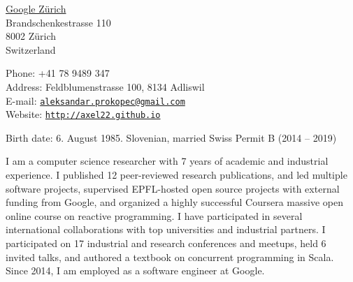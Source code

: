 \documentclass[9pt]{article}
\makeatletter
\def\myaddress{Feldblumenstrasse 100, 8134 Adliswil}
\def\myemail{aleksandar.prokopec@gmail.com}
\def\myweb{http://axel22.github.io}
\def\myphone{+41 78 9489 347}
\makeatother
\begin{document}
\begin{minipage}[t]{1.55in}
 \flushright \href{http://www.google.com/about/company/}{Google Zürich}
   \\ \vspace{-0.03in} Brandschenkestrasse 110
   \\ \vspace{-0.03in} 8002 Zürich
   \\ \vspace{-0.03in} Switzerland

\end{minipage}
\hfill
\hfill
\begin{minipage}[t]{2.7in}
  \flushright Phone: \myphone
  \\ \vspace{-0.03in} Address: \myaddress
  \\ \vspace{-0.03in} E-mail: \texttt{\href{mailto:\myemail}{\myemail}}
  \\ \vspace{-0.03in} Website: \texttt{\href{\myweb}{\myweb}}
\end{minipage}


\medskip
\medskip
\medskip

\reversemarginpar

\medskip

\medskip
{}

\noindent Birth date: 6. August 1985.
\newline\noindent Slovenian, married
\newline\noindent Swiss Permit B (2014 -- 2019)

\bigskip



\noindent
I am a computer science researcher with 7 years of academic
and industrial experience.
I published 12 peer-reviewed research publications,
and led multiple software projects,
supervised EPFL-hosted open source projects with external funding from Google,
and organized a highly successful Coursera massive open online course
on reactive programming.
I have participated in several international collaborations
with top universities and industrial partners.
I participated on 17 industrial and research conferences and meetups,
held 6 invited talks,
and authored a textbook on concurrent programming in Scala.
Since 2014, I am employed as a software engineer at Google.
\newline
\end{document}
